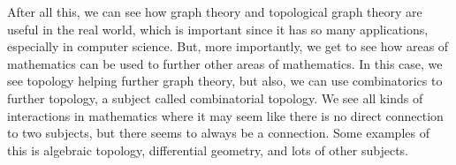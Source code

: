 \documentclass[12pt]{article}
\newcommand{\tab}{\hspace{10mm}}
\theoremstyle{definition}
\theoremstyle{remark}
\begin{document}
\tab After all this, we can see how graph theory and topological graph theory are useful in the real world, which is important since it has so many applications, especially in computer science.
%
But, more importantly, we get to see how areas of mathematics can be used to further other areas of mathematics.
%
In this case, we see topology helping further graph theory, but also, we can use combinatorics to further topology, a subject called combinatorial topology.
%
We see all kinds of interactions in mathematics where it may seem like there is no direct connection to two subjects, but there seems to always be a connection.
%
Some examples of this is algebraic topology, differential geometry, and lots of other subjects. 
\end{document}
